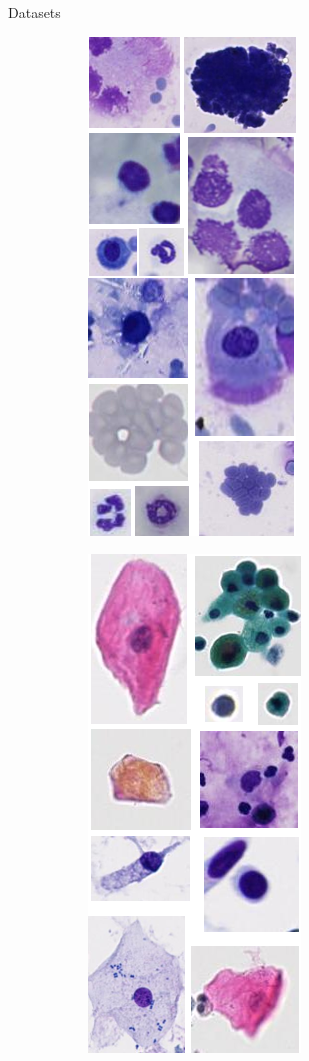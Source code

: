 \documentclass{beamer}
\begin{document}
\begin{frame}{Datasets}
\begin{figure}
    \begin{subfigure}{0.1\textwidth}\includegraphics[scale=0.35]{images/illus_lbtd_lba.png}\end{subfigure}
    \begin{subfigure}{0.1\textwidth}\includegraphics[scale=0.35]{images/illus_anapath.png}\end{subfigure}

\end{figure}
\end{frame}
\end{document}
